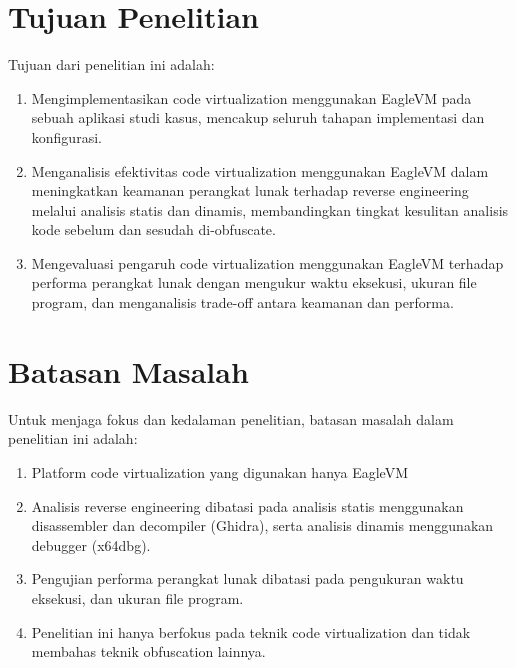 \section{Tujuan Penelitian}
Tujuan dari penelitian ini adalah:

\begin{enumerate}
	\item Mengimplementasikan code virtualization menggunakan EagleVM pada sebuah aplikasi studi kasus, mencakup seluruh tahapan implementasi dan konfigurasi.
	\item Menganalisis efektivitas code virtualization menggunakan EagleVM dalam meningkatkan keamanan perangkat lunak terhadap reverse engineering melalui analisis statis dan dinamis, membandingkan tingkat kesulitan analisis kode sebelum dan sesudah di-obfuscate.

	\item Mengevaluasi pengaruh code virtualization menggunakan EagleVM terhadap performa perangkat lunak dengan mengukur waktu eksekusi, ukuran file program, dan menganalisis trade-off antara keamanan dan performa.

\end{enumerate}

\section{Batasan Masalah}
Untuk menjaga fokus dan kedalaman penelitian, batasan masalah dalam penelitian ini adalah:
\begin{enumerate}

	\item Platform code virtualization yang digunakan hanya EagleVM

	\item Analisis reverse engineering dibatasi pada analisis statis menggunakan disassembler dan decompiler (Ghidra), serta analisis dinamis menggunakan debugger (x64dbg).

	\item Pengujian performa perangkat lunak dibatasi pada pengukuran waktu eksekusi, dan ukuran file program.

	\item Penelitian ini hanya berfokus pada teknik code virtualization dan tidak membahas teknik obfuscation lainnya.

\end{enumerate}
